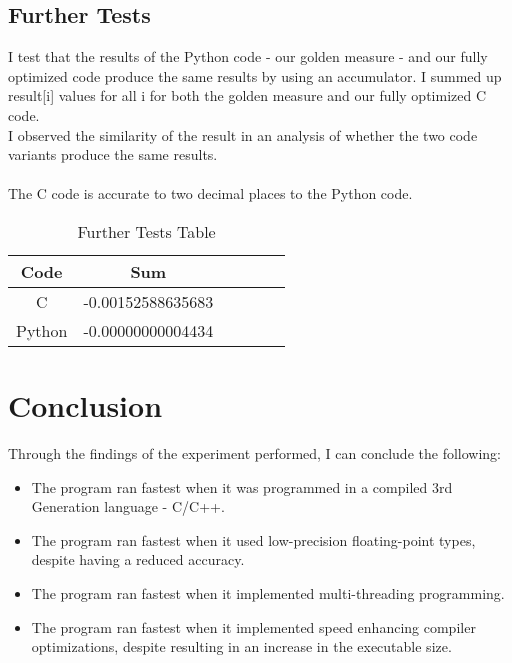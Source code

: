 \documentclass[journal]{IEEEtran}
\begin{document}
\subsection{Further Tests}
I test that the results of the Python code - our golden measure - and our fully optimized code produce the same results by using an accumulator. I summed up result[i] values for all i for both the golden measure and our fully optimized C code. \\
I observed the similarity of the result in an analysis of whether the two code variants produce the same results.\\\\
The C code is accurate to two decimal places to the Python code.
\begin {table}[h!]
\begin{center}
\label{table:8} %
\caption{Further Tests Table}
\begin{tabular}{ |c|c|c|c|c|c| }
\hline
Code   & Sum               \\\hline
C      & -0.00152588635683 \\\hline
Python & -0.00000000004434 \\\hline
\end{tabular}
\end{center}
\end{table}

\section{Conclusion}
Through the findings of the experiment performed, I can conclude the following:
\begin{itemize}
  \item The program ran fastest when it was programmed in a compiled 3rd Generation language - C/C++.
  \item The program ran fastest when it used low-precision floating-point types, despite having a reduced accuracy.
  \item The program ran fastest when it implemented multi-threading programming.
  \item The program ran fastest when it implemented speed enhancing compiler optimizations, despite resulting in an increase in the executable size.
\end{itemize}
\end{document}
